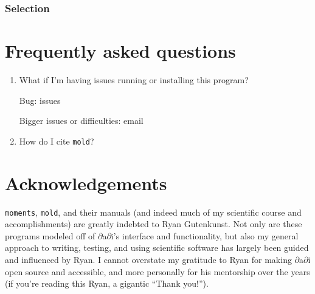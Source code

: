 \documentclass[11pt]{article}
\makeatletter
\newcommand{\dadi}{$\partial$a$\partial$i\xspace}
\newcommand{\mold}{\texttt{mold}\xspace}
\newcommand{\py}[1]{\lstinline[breaklines=true,language=Python, showstringspaces=False]@#1@}
\makeatother
\begin{document}
\subsubsection{Selection}


\section{Frequently asked questions}

\begin{enumerate}

\item What if I'm having issues running or installing this program?

Bug: issues

Bigger issues or difficulties: email

\item How do I cite \mold?

\end{enumerate}



\section{Acknowledgements}
\py{moments}, \mold, and their manuals (and indeed much of my scientific course and accomplishments) are greatly indebted to Ryan Gutenkunst.
Not only are these programs modeled off of \dadi's interface and functionality, but also my general approach to writing, testing, and using scientific software has largely been guided and influenced by Ryan.
I cannot overstate my gratitude to Ryan for making \dadi open source and accessible, and more personally for his mentorship over the years (if you're reading this Ryan, a gigantic ``Thank you!'').





\end{document}
